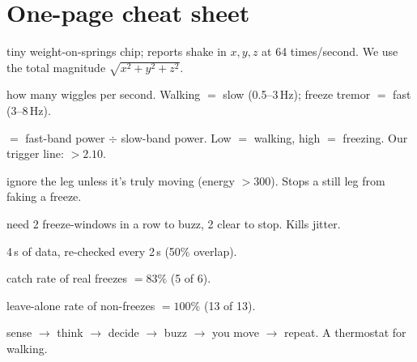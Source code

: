 \documentclass[11pt]{article}
\begin{document}
\section{One-page cheat sheet}

\begin{tcolorbox}[enhanced, colback=white, colframe=teal, boxrule=1pt, arc=3pt,
   left=12pt, right=12pt, top=9pt, bottom=9pt]
\begin{description}[leftmargin=8.6em, style=nextline, font=\bfseries\color{teal}]
  \item[Accelerometer] tiny weight-on-springs chip; reports shake in $x,y,z$ at
        64 times/second. We use the total magnitude $\sqrt{x^2+y^2+z^2}$.
  \item[Frequency] how many wiggles per second. Walking $=$ slow (0.5--3\,Hz);
        freeze tremor $=$ fast (3--8\,Hz).
  \item[Freeze Index] $=$ fast-band power $\div$ slow-band power. Low $=$ walking,
        high $=$ freezing. Our trigger line: $>2.10$.
  \item[Energy gate] ignore the leg unless it's truly moving (energy $>300$). Stops
        a still leg from faking a freeze.
  \item[Debounce] need 2 freeze-windows in a row to buzz, 2 clear to stop. Kills
        jitter.
  \item[Window] 4\,s of data, re-checked every 2\,s (50\% overlap).
  \item[Sensitivity] catch rate of real freezes $=83\%$ (5 of 6).
  \item[Specificity] leave-alone rate of non-freezes $=100\%$ (13 of 13).
  \item[Closed loop] sense $\to$ think $\to$ decide $\to$ buzz $\to$ you move $\to$
        repeat. A thermostat for walking.
\end{description}
\end{tcolorbox}

\vfill
{}
\end{document}
